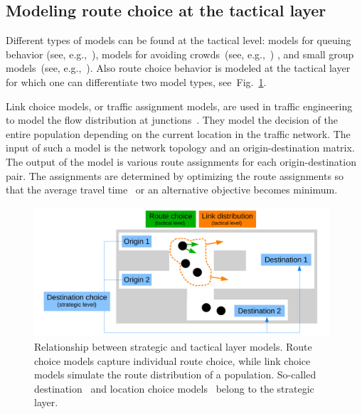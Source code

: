 \subsection{Modeling route choice at the tactical layer}
Different types of models can be found at the tactical level: models for queuing behavior (see, e.g.,~\cite{kim-2013-cdyn}), models for avoiding crowds~(see, e.g.,~\cite{zoennchen-2013-cdyn}) , and small group models~(see, e.g.,~\cite{seitz-2011-cdyn}). 
Also route choice behavior is modeled at the tactical layer for which one can differentiate two model types, see~Fig.~\ref{fig:differencelinkchoiceroutechoice}.




Link choice models, or traffic assignment models, are used in traffic engineering to model the flow distribution at junctions~\cite{boyce-2021-cdynff}. They model the decision of the entire population depending on the current location in the traffic network. The input of such a model is the network topology and an origin-destination matrix. The output of the model is various route assignments for each origin-destination pair. The assignments are determined by optimizing the route assignments so that the average travel time~\cite{wardrop-1952-cdyn} or an alternative objective becomes minimum. 



\begin{figure}[hbt!]
\centering
\includegraphics[width=11cm]{../figures/state-of-the-art/crowds/abgrenzung.pdf} 
\caption[Zusammenhang zwischen Modellen des strategischen und taktischen Layers]{Relationship between strategic and tactical layer models.
Route choice models capture individual route choice, while link choice models simulate the route distribution of a population. So-called destination~\cite{danalet-2015-cdyn} and location choice models~\cite{beaulieu-2019-cdyn} belong to the strategic layer.
}
\label{fig:differencelinkchoiceroutechoice}
\end{figure}

